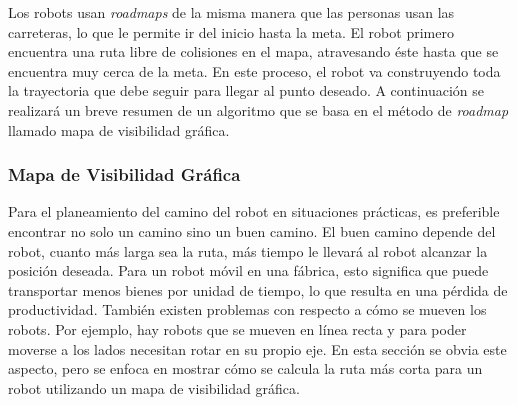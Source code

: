 Los robots usan \textit{roadmaps} de la misma manera que las personas usan 
las carreteras, lo que le permite ir del inicio hasta la meta. El robot 
primero encuentra una ruta libre de colisiones en el mapa, atravesando éste 
hasta que se encuentra muy cerca de la meta. En este proceso, el robot va 
construyendo toda la trayectoria que debe seguir para llegar al punto 
deseado. A continuación se realizará un breve resumen de un algoritmo que 
se basa en el método de \textit{roadmap} llamado mapa de visibilidad gr\'afica.




\subsubsection{Mapa de Visibilidad Gráfica} %

Para el planeamiento del camino del robot en situaciones prácticas, es preferible 
encontrar no solo un camino sino un buen camino. El buen camino depende del 
robot, cuanto más larga sea la ruta, más tiempo le llevará al robot 
alcanzar la posición deseada. Para un robot móvil en una fábrica, esto 
significa que puede transportar menos bienes por unidad de tiempo, lo que 
resulta en una pérdida de productividad. También existen problemas con 
respecto a cómo se mueven los robots. Por ejemplo, hay robots que se mueven 
en línea recta y para poder moverse a los lados necesitan rotar en su 
propio eje. En esta sección se obvia este aspecto, pero se enfoca en 
mostrar cómo se calcula la ruta más corta para un robot utilizando 
un mapa de visibilidad gráfica.


